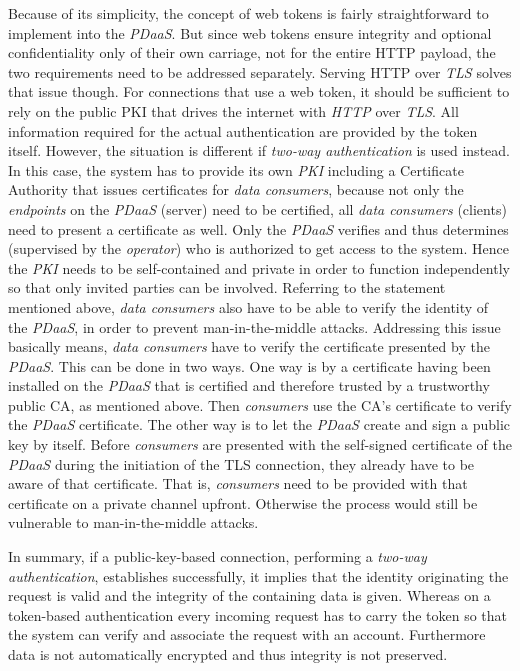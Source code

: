 \documentclass[12pt,english,a4paper,titlepage,cleardoublepage=empty,dottedtoc]{report}
\begin{document}
Because of its simplicity, the concept of web tokens is fairly
straightforward to implement into the \emph{PDaaS}. But since web tokens
ensure integrity and optional confidentiality only of their own
carriage, not for the entire HTTP payload, the two requirements need to
be addressed separately. Serving HTTP over \emph{TLS} solves that issue
though. For connections that use a web token, it should be sufficient to
rely on the public PKI that drives the internet with \emph{HTTP} over
\emph{TLS}. All information required for the actual authentication are
provided by the token itself. However, the situation is different if
\emph{two-way authentication} is used instead. In this case, the system
has to provide its own \emph{PKI} including a Certificate Authority that
issues certificates for \emph{data consumers}, because not only the
\emph{endpoints} on the \emph{PDaaS} (server) need to be certified, all
\emph{data consumers} (clients) need to present a certificate as well.
Only the \emph{PDaaS} verifies and thus determines (supervised by the
\emph{operator}) who is authorized to get access to the system. Hence
the \emph{PKI} needs to be self-contained and private in order to
function independently so that only invited parties can be involved.
Referring to the statement mentioned above, \emph{data consumers} also
have to be able to verify the identity of the \emph{PDaaS}, in order to
prevent man-in-the-middle attacks. Addressing this issue basically
means, \emph{data consumers} have to verify the certificate presented by
the \emph{PDaaS}. This can be done in two ways. One way is by a
certificate having been installed on the \emph{PDaaS} that is certified
and therefore trusted by a trustworthy public CA, as mentioned above.
Then \emph{consumers} use the CA's certificate to verify the
\emph{PDaaS} certificate. The other way is to let the \emph{PDaaS}
create and sign a public key by itself. Before \emph{consumers} are
presented with the self-signed certificate of the \emph{PDaaS} during
the initiation of the TLS connection, they already have to be aware of
that certificate. That is, \emph{consumers} need to be provided with
that certificate on a private channel upfront. Otherwise the process
would still be vulnerable to man-in-the-middle attacks.

In summary, if a public-key-based connection, performing a \emph{two-way
authentication}, establishes successfully, it implies that the identity
originating the request is valid and the integrity of the containing
data is given. Whereas on a token-based authentication every incoming
request has to carry the token so that the system can verify and
associate the request with an account. Furthermore data is not
automatically encrypted and thus integrity is not preserved.
\end{document}
